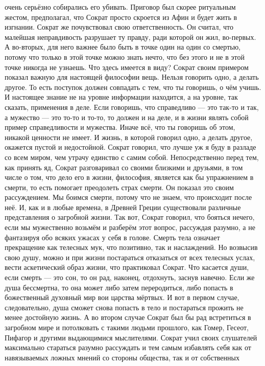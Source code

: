 очень серьёзно собирались его убивать. Приговор был скорее ритуальным жестом,
предполагал, что Сократ просто скроется из Афин и будет жить в изгнании. Сократ
же почувствовал свою ответственность. Он считал, что малейшая неправдивость
разрушает ту правду, ради которой он жил, во-первых. А во-вторых, для него
важнее было быть в точке один на один со смертью, потому что только в этой точке
можно знать нечто, что без этого и не в этой точке никогда не узнаешь. Что здесь
имеется в виду? Сократ своим примером показал важную для настоящей философии
вещь. Нельзя говорить одно, а делать другое. То есть поступок должен совпадать с
тем, что ты говоришь, о чём учишь. И настоящее знание не на уровне информации
находится, а на уровне, так сказать, применения в деле. Если говоришь, что
справедливо — это так-то и так, а мужество — это то-то и то-то, то должен и на
деле, и в жизни являть собой пример справедливости и мужества. Иначе всё, что ты
говоришь об этом, никакой ценности не имеет. И жизнь, в которой говорил одно, а
делать другое, окажется пустой и недостойной. Сократ говорил, что лучше уж я
буду в разладе со всем миром, чем утрачу единство с самим собой. Непосредственно
перед тем, как принять яд, Сократ разговаривал со своими близкими и друзьями, в
том числе о том, что дело его в жизни, философия, является как бы упражнением в
смерти, то есть помогает преодолеть страх смерти. Он показал это своим
рассуждением. Мы боимся смерти, потому что не знаем, что происходит после неё.
И, как и в любые времена, в Древней Греции существовали различные представления
о загробной жизни. Так вот, Сократ говорил, что бояться нечего, если мы
мужественно возьмём и разберём этот вопрос, рассуждая разумно, а не фантазируя
обо всяких ужасах у себя в голове. Смерть тела означает прекращение как телесных
мук, что позитивно, так и наслаждений. Но возвысив свою душу, можно и при жизни
постараться отказаться от всех телесных услах, вести аскетический образ жизни,
что практиковал Сократ. Что касается души, если смерть — это сон, то он рад,
наконец, отдохнуть, заснув навечно. Если же душа бессмертна, то она может либо
затем переродиться, либо попасть в божественный духовный мир вои царства
мёртвых. И вот в первом случае, следовательно, душа сможет снова попасть в тело
и постараться прожить не менее достойную жизнь. А во втором случае Сократ был бы
рад встретиться в загробном мире и потолковать с такими людьми прошлого, как
Гомер, Гесеот, Пифагор и другими выдающимися мыслителями. Сократ учил своих
слушателей максимально стараться разумно рассуждать и тем самым избавлять себя
как от навязываемых ложных мнений со стороны общества, так и от собственных
